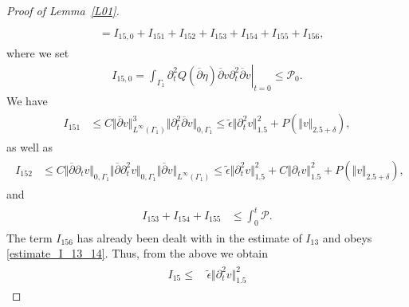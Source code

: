 \documentclass[10pt,reqno]{amsart}
\theoremstyle{plain}
\theoremstyle{definition}
\numberwithin{equation}{section}
\newcommand{\ccP}{\mathscr{P}}
\newcommand{\ccPz}{\mathscr{P}_0}
\newcommand{\Ga}{\Gamma}
\newcommand{\de}{\delta}
\newcommand{\norm}[1]{\Vert#1\Vert}
\begin{document}
\begin{proof}[Proof of Lemma~\ref{L01}]
\begin{align}
\begin{split}
\\ &\!\!\!
=
I_{15,0}
+ I_{151}
+ I_{152}
+ I_{153}
+ I_{154}
+ I_{155}
+ I_{156},
\end{split}
\nonumber
\end{align}
where we 
set
\begin{gather}
I_{15,0}
=
\left. \int_{\Ga_1} \partial^2_t Q(\overline{\partial} \eta) \overline{\partial} v
\partial^2_t \overline{\partial} v \right|_{t=0}
\leq \ccPz
   .%
\nonumber
\end{gather}
We have
\begin{align}
\begin{split}
I_{151}  & \leq 
C \norm{\overline{\partial} v}^3_{L^\infty(\Ga_1)} 
\norm{\partial^2_t \overline{\partial} v}_{0,\Ga_1} 
\leq \widetilde{\epsilon} \norm{\partial^2_t v}_{1.5}^2 + 
P(\norm{v}_{2.5+\de}),
\end{split}
\nonumber
\end{align}
as well as
\begin{align}
\begin{split}
I_{152}  & \leq 
C \norm{\overline{\partial} \partial_t v}_{0,\Ga_1} 
\norm{\overline{\partial} \partial^2_t v}_{0,\Ga_1} 
\norm{\overline{\partial} v}_{L^\infty(\Ga_1)}
\leq 
\widetilde{\epsilon} \norm{\partial^2_t v}^2_{1.5} 
+ C\norm{\partial_t v}^2_{1.5} 
+ P(\norm{v}_{2.5+\de}),
\end{split}
\nonumber
\end{align}
and
\begin{align}
\begin{split}
I_{153} + I_{154} + I_{155}  & \leq 
\int_0^t\ccP.
\end{split}
\nonumber
\end{align}
The term  $I_{156} $ has already been dealt with in the estimate
of $I_{13}$ and obeys \eqref{estimate_I_13_14}. Thus, from the above we obtain
\begin{align}
\begin{split}
I_{15} \leq &
\,
\widetilde{\epsilon} \norm{\partial^2_t v}^2_{1.5}  

\end{split}
\end{align}
\end{proof}
\end{document}
